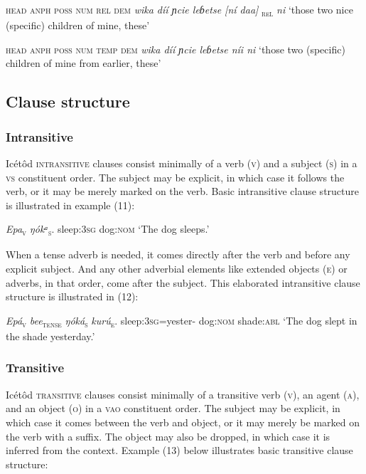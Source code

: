 \begin{table}
\textsc{head anph poss num rel dem}
\textit{wika díí ɲcie leɓetse [ní daa]}\textsc{\textsubscript{ rel}}\textit{ ni}
‘those two nice (specific) children of mine, these’




\textsc{head anph poss num temp dem}
\textit{wika díí ɲcie leɓetse níi ni}
‘those two (specific) children of mine from earlier, these’






\subsection{Clause structure}
\subsubsection{Intransitive}

Icétôd \textsc{intransitive} clauses consist minimally of a verb (\textsc{v}) and a subject (\textsc{s}) in a \textsc{vs} constituent order. The subject may be explicit, in which case it follows the verb, or it may be merely marked on the verb. Basic intransitive clause structure is illustrated in example (11):




\textit{Epa}\textsc{\textsubscript{v}}\textsc{    }\textit{ŋókᵃ}\textsc{\textsubscript{s}}.
sleep:\textsc{3sg}   dog:\textsc{nom}
‘The dog sleeps.’


When a tense adverb is needed, it comes directly after the verb and before any explicit subject. And any other adverbial elements like extended objects (\textsc{e}) or adverbs, in that order, come after the subject. This elaborated intransitive clause structure is illustrated in (12):



\textit{Epá}\textsc{\textsubscript{v}} \textit{bee}\textsc{\textsubscript{tense}}\textit{   ŋóká}\textsc{\textsubscript{s}}\textit{     kurú}\textsc{\textsubscript{e}}.
sleep:\textsc{3sg}=yester-   dog:\textsc{nom}   shade:\textsc{abl}
‘The dog slept in the shade yesterday.’




\subsubsection{Transitive}

Icétôd \textsc{transitive} clauses consist minimally of a transitive verb (\textsc{v}), an agent (\textsc{a}), and an object (\textsc{o}) in a \textsc{vao} constituent order. The subject may be explicit, in which case it comes between the verb and object, or it may merely be marked on the verb with a suffix. The object may also be dropped, in which case it is inferred from the context. Example (13) below illustrates basic transitive clause structure:





\end{table}
